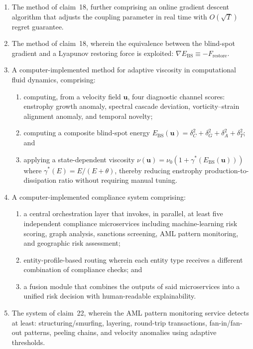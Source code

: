 \documentclass[12pt,a4paper]{article}
\begin{document}
\begin{enumerate}[label=\textbf{\arabic*.}, leftmargin=2em]
\item The method of claim~18, further comprising an online gradient descent
algorithm that adjusts the coupling parameter in real time with
$O(\sqrt{T})$ regret guarantee.

\item The method of claim~18, wherein the equivalence between the blind-spot
gradient and a Lyapunov restoring force is exploited:
$\nabla E_{\mathrm{BS}} \equiv -F_{\mathrm{restore}}$.

\item A computer-implemented method for adaptive viscosity in computational
fluid dynamics, comprising:
\begin{enumerate}[label=(\alph*)]
  \item computing, from a velocity field $\mathbf{u}$, four diagnostic channel
    scores: enstrophy growth anomaly, spectral cascade deviation,
    vorticity--strain alignment anomaly, and temporal novelty;
  \item computing a composite blind-spot energy
    $E_{\mathrm{BS}}(\mathbf{u}) = \delta_C^2 + \delta_G^2 + \delta_A^2
    + \delta_T^2$; and
  \item applying a state-dependent viscosity
    $\nu(\mathbf{u}) = \nu_0(1 + \gamma^*(E_{\mathrm{BS}}(\mathbf{u})))$
    where $\gamma^*(E) = E/(E + \theta)$, thereby reducing enstrophy
    production-to-dissipation ratio without requiring manual tuning.
\end{enumerate}

\item A computer-implemented compliance system comprising:
\begin{enumerate}[label=(\alph*)]
  \item a central orchestration layer that invokes, in parallel, at least five
    independent compliance microservices including machine-learning risk
    scoring, graph analysis, sanctions screening, AML pattern monitoring, and
    geographic risk assessment;
  \item entity-profile-based routing wherein each entity type receives a
    different combination of compliance checks; and
  \item a fusion module that combines the outputs of said microservices into
    a unified risk decision with human-readable explainability.
\end{enumerate}

\item The system of claim~22, wherein the AML pattern monitoring service
detects at least: structuring/smurfing, layering, round-trip transactions,
fan-in/fan-out patterns, peeling chains, and velocity anomalies using
adaptive thresholds.


\end{enumerate}
\end{document}
